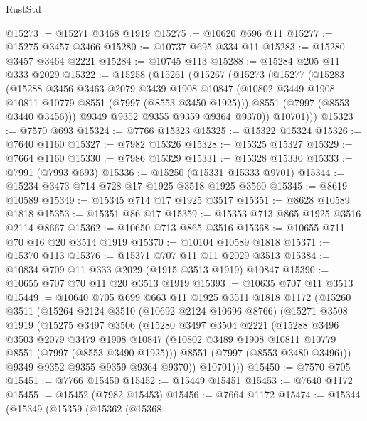 \begin{lexlean}{RustStd}
\begin{coremodule}
{\begin{coremodule}
{{{{{{{{{{{{{{{{{{{{{{{{{{{{{{{{{{{{{{{{{{{@15273 := @15271 @3468 @1919
@15275 := @10620 @696 @11
@15277 := @15275 @3457 @3466
@15280 := @10737 @695 @334 @11
@15283 := @15280 @3457 @3464 @2221
@15284 := @10745 @113
@15288 := @15284 @205 @11 @333 @2029
@15322 := @15258
    (@15261
      (@15267
        (@15273
          (@15277
            (@15283
              (@15288
                @3456
                @3463
                @2079
                @3439
                @1908
                @10847
                (@10802 @3449 @1908 @10811 @10779 @8551 (@7997 (@8553 @3450 @1925)))
                @8551
                (@7997 (@8553 @3440 @3456)))
              @9349
              @9352
              @9355
              @9359
              @9364
              @9370))
          @10701)))
@15323 := @7570 @693
@15324 := @7766 @15323
@15325 := @15322 @15324
@15326 := @7640 @1160
@15327 := @7982 @15326
@15328 := @15325 @15327
@15329 := @7664 @1160
@15330 := @7986 @15329
@15331 := @15328 @15330
@15333 := @7991 (@7993 @693)
@15336 := @15250 (@15331 @15333 @9701)
@15344 := @15234 @3473 @714 @728 @17 @1925 @3518 @1925 @3560
@15345 := @8619 @10589
@15349 := @15345 @714 @17 @1925 @3517
@15351 := @8628 @10589 @1818
@15353 := @15351 @86 @17
@15359 := @15353 @713 @865 @1925 @3516 @2114 @8667
@15362 := @10650 @713 @865 @3516
@15368 := @10655 @711 @70 @16 @20 @3514 @1919
@15370 := @10104 @10589 @1818
@15371 := @15370 @113
@15376 := @15371 @707 @11 @11 @2029 @3513
@15384 := @10834 @709 @11 @333 @2029 (@1915 @3513 @1919) @10847
@15390 := @10655 @707 @70 @11 @20 @3513 @1919
@15393 := @10635 @707 @11 @3513
@15449 := @10640
    @705
    @699
    @663
    @11
    @1925
    @3511
    @1818
    @1172
    (@15260
      @3511
      (@15264
        @2124
        @3510
        (@10692 @2124 @10696 @8766)
        (@15271
          @3508
          @1919
          (@15275
            @3497
            @3506
            (@15280
              @3497
              @3504
              @2221
              (@15288
                @3496
                @3503
                @2079
                @3479
                @1908
                @10847
                (@10802 @3489 @1908 @10811 @10779 @8551 (@7997 (@8553 @3490 @1925)))
                @8551
                (@7997 (@8553 @3480 @3496)))
              @9349
              @9352
              @9355
              @9359
              @9364
              @9370))
          @10701)))
@15450 := @7570 @705
@15451 := @7766 @15450
@15452 := @15449 @15451
@15453 := @7640 @1172
@15455 := @15452 (@7982 @15453)
@15456 := @7664 @1172
@15474 := @15344
    (@15349
      (@15359
        (@15362
          (@15368
}}}}}}}}}}}}}}}}}}}}}}}}}}}}}}}}}}}}}}}}}}}
\end{coremodule}}
\end{coremodule}
\end{lexlean}
